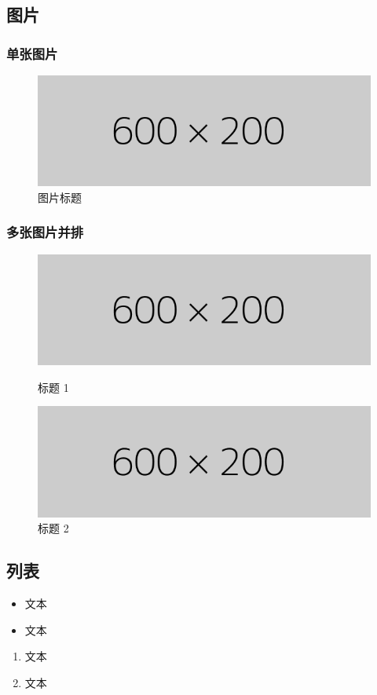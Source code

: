 \documentclass[hyperref,a4paper,UTF8]{ctexart}
\begin{document}
\subsection{图片}

\subsubsection{单张图片}

\begin{figure}[H]
    \centering
    \includegraphics[width=0.5 \textwidth]{./image.png}
    \caption{图片标题}
\end{figure}

\subsubsection{多张图片并排}

\begin{figure}[H]
    \centering
    \begin{minipage}[t]{0.48\textwidth}
        \centering
        \includegraphics[width=1\textwidth]{./image.png}
        \caption{标题 1}\label{标题 1}
    \end{minipage}
    \begin{minipage}[t]{0.48\textwidth}
        \centering
        \includegraphics[width=1\textwidth]{./image.png}
        \caption{标题 2}\label{标题 2}
    \end{minipage}
\end{figure}

\subsection{列表}

\begin{itemize}
    \item
          文本
    \item
          文本
\end{itemize}

\begin{enumerate}
    \item
          文本
    \item
          文本
\end{enumerate}
\end{document}
